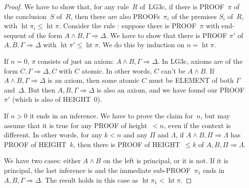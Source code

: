 \documentclass[10pt,a4paper]{article}
\newcommand*{\olup}[1]{\MakeUppercase{#1}}
\theoremstyle{plain}
\theoremstyle{definition}
\theoremstyle{remark}
\providecommand{\Sequent}{\mathrel{\Rightarrow}}
\providecommand{\Log}{\ensuremath{\mathrm{L}}}
\providecommand{\LeftR}[1]{}
\providecommand{\pheight}{\operatorname{ht}}
\providecommand{\LeftR}{\mathrm{L}}
\begin{document}
\begin{proof}
We have to show that, for any rule~$R$ of~\Log{G3c}, if there is
\olup{proof}~$\pi$ of the conclusion~$S$ of~$R$, then there are also
\olup{proof}s~$\pi_i$ of the premises $S_i$ of~$R$, with $\pheight{\pi_i}
\le \pheight{\pi}$. Consider the rule \LeftR{\land}: suppose there is
\olup{proof}~$\pi$ with end-sequent of the form $A \land B, \Gamma
\Sequent \Delta$. We have to show that there is \olup{proof} $\pi'$ of
$A, B, \Gamma \Sequent \Delta$ with $\pheight{\pi'} \le
\pheight{\pi}$. We do this by induction on $n = \pheight{\pi}$.

If $n = 0$, $\pi$ consists of just an axiom: $A \land B, \Gamma
\Sequent \Delta$. In \Log{G3c}, axioms are of the form $C, \Gamma
\Sequent \Delta, C$ with $C$ atomic. In other words, $C$ can't be
$A \land B$. If $A \land B, \Gamma \Sequent \Delta$ is an axiom,
then some atomic $C$ must be \olup{element} of both $\Gamma$
and~$\Delta$. But then $A, B, \Gamma \Sequent \Delta$ is also an
axiom, and we have found our \olup{proof}~$\pi'$ (which is also of
\olup{height}~$0$).

If $n>0$ it ends in an inference. We have to prove the claim for~$n$,
but may assume that it is true for any \olup{proof} of height~$<n$, even
if the context is different. In other words, for any $k<n$ and any
$\Pi$ and $\Lambda$, if $A \land B, \Pi \Sequent \Lambda$ has
\olup{proof} of \olup{height}~$k$, then there is \olup{proof} of
\olup{height}~$\le k$ of $A, B, \Pi \Sequent \Lambda$.

We have two cases: either $A \land
B$ on the left is principal, or it is not. If it is principal, the
last inference is \LeftR{\land} and the immediate
sub-\olup{proof}~$\pi_1$ ends in $A, B, \Gamma \Sequent \Delta$. The
result holds in this case as $\pheight{\pi_1} < \pheight{\pi}$.


\end{proof}
\end{document}
